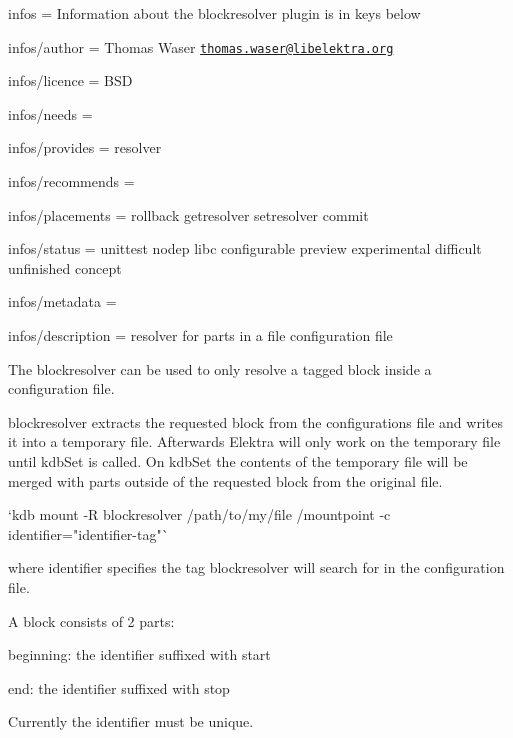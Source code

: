 
\begin{DoxyItemize}
\item infos = Information about the blockresolver plugin is in keys below
\item infos/author = Thomas Waser \href{mailto:thomas.waser@libelektra.org}{\tt thomas.\+waser@libelektra.\+org}
\item infos/licence = B\+SD
\item infos/needs =
\item infos/provides = resolver
\item infos/recommends =
\item infos/placements = rollback getresolver setresolver commit
\item infos/status = unittest nodep libc configurable preview experimental difficult unfinished concept
\item infos/metadata =
\item infos/description = resolver for parts in a file configuration file
\end{DoxyItemize}

The {\ttfamily blockresolver} can be used to only resolve a tagged block inside a configuration file.

{\ttfamily blockresolver} extracts the requested block from the configurations file and writes it into a temporary file. Afterwards Elektra will only work on the temporary file until kdb\+Set is called. On kdb\+Set the contents of the temporary file will be merged with parts outside of the requested block from the original file.

\begin{DoxyVerb}`kdb mount -R blockresolver /path/to/my/file /mountpoint -c identifier="identifier-tag"`
\end{DoxyVerb}


where {\ttfamily identifier} specifies the tag {\ttfamily blockresolver} will search for in the configuration file.

A block consists of 2 parts\+:


\begin{DoxyItemize}
\item beginning\+: the identifier suffixed with {\ttfamily start}
\item end\+: the identifier suffixed with {\ttfamily stop}
\end{DoxyItemize}

Currently the identifier must be unique.


